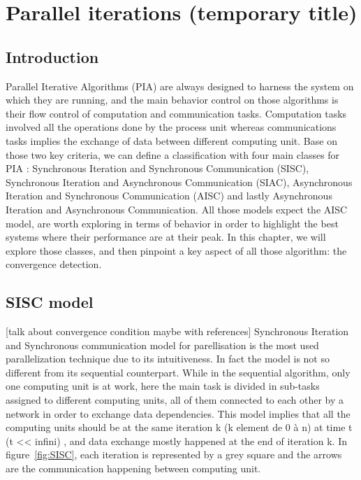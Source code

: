 \chapter{Parallel iterations (temporary title)}


\section{Introduction}

Parallel Iterative Algorithms (PIA) are always designed to harness the system on which they are running, and the main behavior control on those algorithms is their flow control of computation and communication tasks. Computation tasks involved all the operations done by the process unit whereas communications tasks implies the exchange of data between different computing unit. Base on those two key criteria, we can define a classification with four main classes for PIA : Synchronous Iteration and Synchronous Communication (SISC), Synchronous Iteration and Asynchronous Communication (SIAC), Asynchronous Iteration and Synchronous Communication (AISC) and lastly Asynchronous Iteration and Asynchronous Communication. All those models expect the AISC model, are worth exploring in terms of behavior in order to highlight the best systems where their performance are at their peak.
In this chapter, we will explore those classes, and then pinpoint a key aspect of all those algorithm: the convergence detection.



\section{SISC model}

[talk about convergence condition maybe with references]
Synchronous Iteration and Synchronous communication model for parellisation is the most used parallelization technique due to its intuitiveness. In fact the model is not so different from its sequential counterpart. While in the sequential algorithm, only one computing unit is at work, here the main task is divided in sub-tasks assigned to different computing units, all of them connected to each other by a network in order to exchange data dependencies. This model implies that all the computing units should be at the same iteration k (k element de 0 à n)  at time t (t << infini) , and data exchange mostly happened at the end of iteration k. In figure~\ref{fig:SISC}, each iteration is represented by a grey square and the arrows are the communication happening between computing unit.



